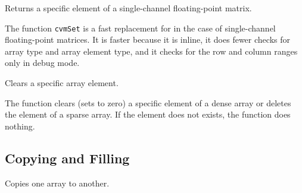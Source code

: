 \label{mSet}

Returns a specific element of a single-channel floating-point matrix.


\begin{description}
\end{description}


The function \texttt{cvmSet} is a fast replacement for 
in the case of single-channel floating-point matrices. It is faster because
it is inline, it does fewer checks for array type and array element type, 
and it checks for the row and column ranges only in debug mode.

\label{ClearND}

Clears a specific array element.


\begin{description}
\end{description}


The function  clears (sets to zero) a specific element of a dense array or deletes the element of a sparse array. If the element does not exists, the function does nothing.


\subsection{Copying and Filling}


\label{Copy}

Copies one array to another.


\begin{description}
\end{description}


